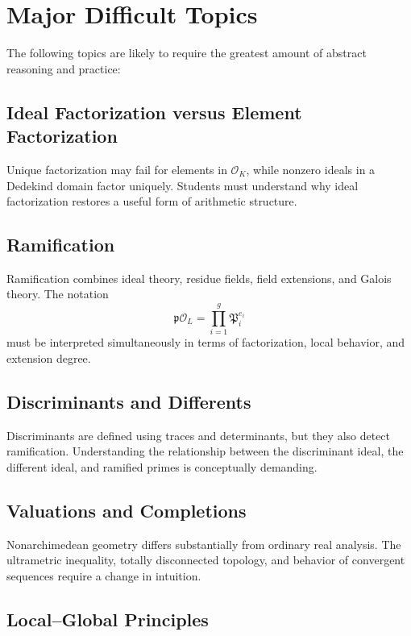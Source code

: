 \documentclass[11pt]{article}
\begin{document}
\section{Major Difficult Topics}

The following topics are likely to require the greatest amount of abstract
reasoning and practice:

\subsection{Ideal Factorization versus Element Factorization}

Unique factorization may fail for elements in \(\mathcal{O}_K\), while
nonzero ideals in a Dedekind domain factor uniquely. Students must understand
why ideal factorization restores a useful form of arithmetic structure.

\subsection{Ramification}

Ramification combines ideal theory, residue fields, field extensions, and
Galois theory. The notation
\[
    \mathfrak{p}\mathcal{O}_L
    =
    \prod_{i=1}^{g}\mathfrak{P}_i^{e_i}
\]
must be interpreted simultaneously in terms of factorization, local
behavior, and extension degree.

\subsection{Discriminants and Differents}

Discriminants are defined using traces and determinants, but they also detect
ramification. Understanding the relationship between the discriminant ideal,
the different ideal, and ramified primes is conceptually demanding.

\subsection{Valuations and Completions}

Nonarchimedean geometry differs substantially from ordinary real analysis.
The ultrametric inequality, totally disconnected topology, and behavior of
convergent sequences require a change in intuition.

\subsection{Local--Global Principles}
\end{document}
